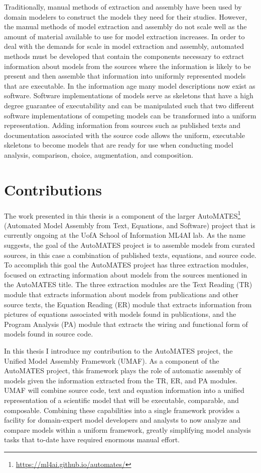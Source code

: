 Traditionally, manual methods of extraction and assembly have been used by domain modelers to construct the models they need for their studies.
However, the manual methods of model extraction and assembly do not scale well as the amount of material available to use for model extraction increases.
In order to deal with the demands for scale in model extraction and assembly, automated methods must be developed that contain the components necessary to extract information about models from the sources where the information is likely to be present and then assemble that information into uniformly represented models that are executable.
In the information age many model descriptions now exist as software.
Software implementations of models serve as skeletons that have a high degree guarantee of executability and can be manipulated such that two different software implementations of competing models can be transformed into a uniform representation.
Adding information from sources such as published texts and documentation associated with the source code allows the uniform, executable skeletons to become models that are ready for use when conducting model analysis, comparison, choice, augmentation, and composition.

\section{Contributions\label{sec:contributions}}
The work presented in this thesis is a component of the larger AutoMATES\footnote{\url{https://ml4ai.github.io/automates/}} (Automated Model Assembly from Text, Equations, and Software) project \citep{pyarelal2019} that is currently ongoing at the UofA School of Information ML4AI lab.
As the name suggests, the goal of the AutoMATES project is to assemble models from curated sources, in this case a combination of published texts, equations, and source code.
To accomplish this goal the AutoMATES project has three extraction modules, focused on extracting information about models from the sources mentioned in the AutoMATES title.
The three extraction modules are the Text Reading (TR) module that extracts information about models from publications and other source texts, the Equation Reading (ER) module that extracts information from pictures of equations associated with models found in publications, and the Program Analysis (PA) module that extracts the wiring and functional form of models found in source code.

In this thesis I introduce my contribution to the AutoMATES project, the Unified Model Assembly Framework (UMAF).
As a component of the AutoMATES project, this framework plays the role of automatic assembly of models given the information extracted from the TR, ER, and PA modules.
UMAF will combine source code, text and equation information into a unified representation of a scientific model that will be executable, comparable, and composable.
Combining these capabilities into a single framework provides a facility for domain-expert model developers and analysts to now analyze and compare models within a uniform framework, greatly simplifying model analysis tasks that to-date have required enormous manual effort.

